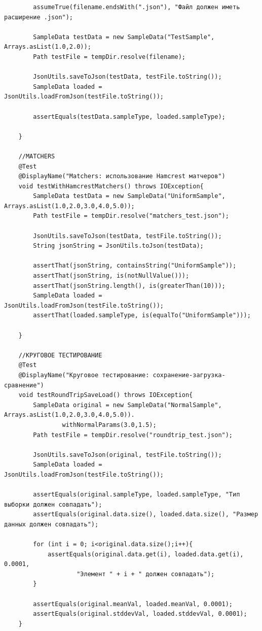 \begin{verbatim}
        assumeTrue(filename.endsWith(".json"), "Файл должен иметь расширение .json");

        SampleData testData = new SampleData("TestSample", Arrays.asList(1.0,2.0));
        Path testFile = tempDir.resolve(filename);

        JsonUtils.saveToJson(testData, testFile.toString());
        SampleData loaded = JsonUtils.loadFromJson(testFile.toString());

        assertEquals(testData.sampleType, loaded.sampleType);

    }

    //MATCHERS
    @Test
    @DisplayName("Matchers: использование Hamcrest матчеров")
    void testWithHamcrestMatchers() throws IOException{
        SampleData testData = new SampleData("UniformSample", Arrays.asList(1.0,2.0,3.0,4.0,5.0));
        Path testFile = tempDir.resolve("matchers_test.json");

        JsonUtils.saveToJson(testData, testFile.toString());
        String jsonString = JsonUtils.toJson(testData);

        assertThat(jsonString, containsString("UniformSample"));
        assertThat(jsonString, is(notNullValue()));
        assertThat(jsonString.length(), is(greaterThan(10)));
        SampleData loaded = JsonUtils.loadFromJson(testFile.toString());
        assertThat(loaded.sampleType, is(equalTo("UniformSample")));

    }

    //КРУГОВОЕ ТЕСТИРОВАНИЕ
    @Test
    @DisplayName("Круговое тестирование: сохранение-загрузка-сравнение")
    void testRoundTripSaveLoad() throws IOException{
        SampleData original = new SampleData("NormalSample", Arrays.asList(1.0,2.0,3.0,4.0,5.0)).
                withNormalParams(3.0,1.5);
        Path testFile = tempDir.resolve("roundtrip_test.json");

        JsonUtils.saveToJson(original, testFile.toString());
        SampleData loaded = JsonUtils.loadFromJson(testFile.toString());

        assertEquals(original.sampleType, loaded.sampleType, "Тип выборки должен совпадать");
        assertEquals(original.data.size(), loaded.data.size(), "Размер данных должен совпадать");

        for (int i = 0; i<original.data.size();i++){
            assertEquals(original.data.get(i), loaded.data.get(i), 0.0001,
                    "Элемент " + i + " должен совпадать");
        }

        assertEquals(original.meanVal, loaded.meanVal, 0.0001);
        assertEquals(original.stddevVal, loaded.stddevVal, 0.0001);
    }


\end{verbatim}
